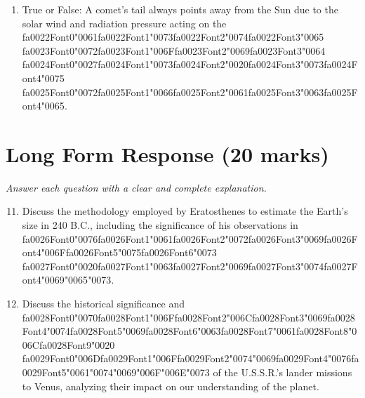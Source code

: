 \documentclass[12pt]{article}
\begin{document}
\begin{enumerate}[label=\arabic*.]
\item True or False: A comet's tail always points away from the Sun due to the solar wind and radiation pressure acting on the {\csname fa0022Font0\endcsname\char"0061}{\csname fa0022Font1\endcsname\char"0073}{\csname fa0022Font2\endcsname\char"0074}{\csname fa0022Font3\endcsname\char"0065} {\csname fa0023Font0\endcsname\char"0072}{\csname fa0023Font1\endcsname\char"006F}{\csname fa0023Font2\endcsname\char"0069}{\csname fa0023Font3\endcsname\char"0064} {\csname fa0024Font0\endcsname\char"0027}{\csname fa0024Font1\endcsname\char"0073}{\csname fa0024Font2\endcsname\char"0020}{\csname fa0024Font3\endcsname\char"0073}{\csname fa0024Font4\endcsname\char"0075} {\csname fa0025Font0\endcsname\char"0072}{\csname fa0025Font1\endcsname\char"0066}{\csname fa0025Font2\endcsname\char"0061}{\csname fa0025Font3\endcsname\char"0063}{\csname fa0025Font4\endcsname\char"0065}.
\end{enumerate}

\section*{Long Form Response (20 marks)}
\textit{Answer each question with a clear and complete explanation.}
\begin{enumerate}[label=\arabic*.]
\setcounter{enumi}{10}
\item Discuss the methodology employed by Eratosthenes to estimate the Earth's size in 240 B.C.,
including the significance of his observations in {\csname fa0026Font0\endcsname\char"0076}{\csname fa0026Font1\endcsname\char"0061}{\csname fa0026Font2\endcsname\char"0072}{\csname fa0026Font3\endcsname\char"0069}{\csname fa0026Font4\endcsname\char"006F}{\csname fa0026Font5\endcsname\char"0075}{\csname fa0026Font6\endcsname\char"0073} {\csname fa0027Font0\endcsname\char"0020}{\csname fa0027Font1\endcsname\char"0063}{\csname fa0027Font2\endcsname\char"0069}{\csname fa0027Font3\endcsname\char"0074}{\csname fa0027Font4\endcsname\char"0069}{\char"0065}{\char"0073}.
\item Discuss the historical significance and {\csname fa0028Font0\endcsname\char"0070}{\csname fa0028Font1\endcsname\char"006F}{\csname fa0028Font2\endcsname\char"006C}{\csname fa0028Font3\endcsname\char"0069}{\csname fa0028Font4\endcsname\char"0074}{\csname fa0028Font5\endcsname\char"0069}{\csname fa0028Font6\endcsname\char"0063}{\csname fa0028Font7\endcsname\char"0061}{\csname fa0028Font8\endcsname\char"006C}{\csname fa0028Font9\endcsname\char"0020} {\csname fa0029Font0\endcsname\char"006D}{\csname fa0029Font1\endcsname\char"006F}{\csname fa0029Font2\endcsname\char"0074}{\char"0069}{\csname fa0029Font4\endcsname\char"0076}{\csname fa0029Font5\endcsname\char"0061}{\char"0074}{\char"0069}{\char"006F}{\char"006E}{\char"0073} of the U.S.S.R.'s lander
missions to Venus, analyzing their impact on our understanding of the planet.
\end{enumerate}
\end{document}
